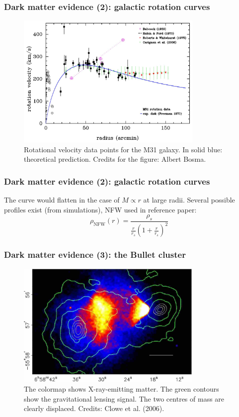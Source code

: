 \documentclass{beamer}
\begin{document}
\begin{frame}
\frametitle{Dark matter evidence (2): galactic rotation curves}
\begin{figure}[htbp]
	\centering
	\includegraphics[width=0.8\textwidth]{rotation_curves.jpg}
	\caption{Rotational velocity data points for the M31 galaxy. In solid blue: theoretical prediction. Credits for the figure: Albert Bosma.}
	\label{fig:rotation_curves}
\end{figure}
\end{frame}

\begin{frame}
\frametitle{Dark matter evidence (2): galactic rotation curves}
The curve would flatten in the case of \(M \propto r\) at large radii. Several possible profiles exist (from simulations), NFW used in reference paper:
\[
	\rho_{\mathrm{NFW} } (r) = \frac{\rho _s}{\frac{r}{r_s} \left( 1+ \frac{r}{r_s} \right) ^2}
\]
\end{frame}

\begin{frame}
\frametitle{Dark matter evidence (3): the Bullet cluster}
\begin{figure}[htbp]
	\centering
	\includegraphics[width=0.8\textwidth]{bullet.jpg}
	\caption{The colormap shows X-ray-emitting matter. The green contours show the gravitational lensing signal. The two centres of mass are clearly displaced. Credits: Clowe et al. (2006).}
	\label{fig:bullet}
\end{figure}
\end{frame}
\end{document}
